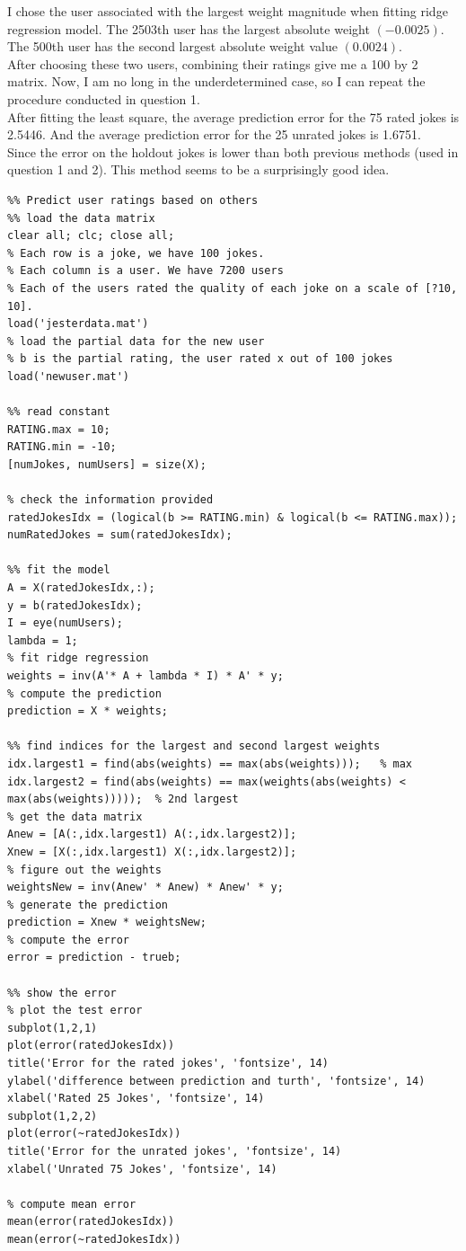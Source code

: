 \documentclass[paper=a4, fontsize=11pt]{scrartcl} %
\numberwithin{equation}{section} %
\numberwithin{figure}{section} %
\numberwithin{table}{section} %
\begin{document}
I chose the user associated with the largest weight magnitude when fitting ridge regression model. The 2503th user has the largest absolute weight $(-0.0025)$. The 500th user has the second largest absolute weight value $(0.0024)$.\\

After choosing these two users, combining their ratings give me a 100 by 2 matrix. Now, I am no long in the underdetermined case, so I can repeat the procedure conducted in question 1. \\

After fitting the least square, the average prediction error for the 75 rated jokes is 2.5446. And the average prediction error for the 25 unrated jokes is  1.6751. \\

Since the error on the holdout jokes is lower than both previous methods (used in question 1 and 2). This method seems to be a surprisingly good idea. 


\newpage
\begin{lstlisting}
%% Predict user ratings based on others
%% load the data matrix
clear all; clc; close all;
% Each row is a joke, we have 100 jokes.
% Each column is a user. We have 7200 users
% Each of the users rated the quality of each joke on a scale of [?10, 10].
load('jesterdata.mat')
% load the partial data for the new user
% b is the partial rating, the user rated x out of 100 jokes
load('newuser.mat')

%% read constant
RATING.max = 10;
RATING.min = -10;
[numJokes, numUsers] = size(X);

% check the information provided
ratedJokesIdx = (logical(b >= RATING.min) & logical(b <= RATING.max));
numRatedJokes = sum(ratedJokesIdx);

%% fit the model
A = X(ratedJokesIdx,:);
y = b(ratedJokesIdx);
I = eye(numUsers);
lambda = 1;
% fit ridge regression
weights = inv(A'* A + lambda * I) * A' * y;
% compute the prediction
prediction = X * weights;

%% find indices for the largest and second largest weights 
idx.largest1 = find(abs(weights) == max(abs(weights)));   % max 
idx.largest2 = find(abs(weights) == max(weights(abs(weights) < max(abs(weights)))));  % 2nd largest 
% get the data matrix 
Anew = [A(:,idx.largest1) A(:,idx.largest2)];
Xnew = [X(:,idx.largest1) X(:,idx.largest2)];
% figure out the weights
weightsNew = inv(Anew' * Anew) * Anew' * y;
% generate the prediction
prediction = Xnew * weightsNew;
% compute the error 
error = prediction - trueb;

%% show the error 
% plot the test error 
subplot(1,2,1)
plot(error(ratedJokesIdx))
title('Error for the rated jokes', 'fontsize', 14)
ylabel('difference between prediction and turth', 'fontsize', 14)
xlabel('Rated 25 Jokes', 'fontsize', 14)
subplot(1,2,2)
plot(error(~ratedJokesIdx))
title('Error for the unrated jokes', 'fontsize', 14)
xlabel('Unrated 75 Jokes', 'fontsize', 14)

% compute mean error
mean(error(ratedJokesIdx))
mean(error(~ratedJokesIdx))
\end{lstlisting}
\end{document}
